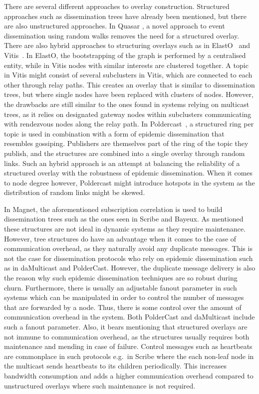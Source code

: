 There are several different approaches to overlay construction.
Structured approaches such as dissemination trees have already been
mentioned, but there are also unstructured approaches. In Quasar
\cite{Wong:2008}, a novel approach to event dissemination using random
walks removes the need for a structured overlay.  There are also hybrid
approaches to structuring overlays such as in ElastO~\cite{Chen:2013}
and Vitis~\cite{Rahimian:2011}. In ElastO, the bootstrapping of the
graph is performed by a centralised entity, while in Vitis nodes with
similar interests are clustered together. A topic in Vitis might consist
of several subclusters in Vitis, which are connected to each other
through relay paths. This creates an overlay that is similar to
dissemination trees, but where single nodes have been replaced with
clusters of nodes. However, the drawbacks are still similar to the ones
found in systems relying on multicast trees, as it relies on designated
gateway nodes within subclusters communicating with rendezvous nodes
along the relay path. In Poldercast~\cite{Setty:2012}, a structured ring
per topic is used in combination with a form of epidemic dissemination
that resembles gossiping. Publishers are themselves part of the ring of
the topic they publish, and the structures are combined into a single
overlay through random links. Such an hybrid approach is an attempt at
balancing the reliability of a structured overlay with the robustness of
epidemic dissemination. When it comes to node degree however, Poldercast
might introduce hotspots in the system as the distribution of random
links might be skewed.

In Magnet, the aforementioned subscription correlation is used to build
dissemination trees such as the ones seen in Scribe and Bayeux. As
mentioned these structures are not ideal in dynamic systems as they
require maintenance. However, tree structures do have an advantage when
it comes to the case of communication overhead, as they naturally avoid
any duplicate messages. This is not the case for dissemination protocols
who rely on epidemic dissemination such as in daMulticast and
PolderCast.  However, the duplicate message delivery is also the reason
why such epidemic dissemination techniques are so robust during churn.
Furthermore, there is usually an adjustable fanout parameter in such
systems which can be manipulated in order to control the number of
messages that are forwarded by a node. Thus, there is some control over
the amount of communication overhead in the system. Both PolderCast and
daMulticast include such a fanout parameter. Also, it bears mentioning
that structured overlays are not immune to communication overhead, as
the structures usually requires both maintenance and mending in case of
failure. Control messages such as heartbeats are commonplace in such
protocols e.g.\ in Scribe where the each non-leaf node in the multicast
sends heartbeats to its children periodically.  This increases bandwidth
consumption and adds a higher communication overhead compared to
unstructured overlays where such maintenance is not required.

